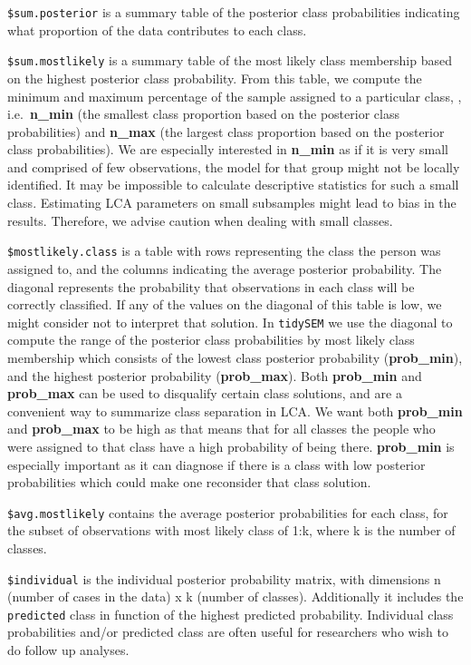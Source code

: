 \documentclass[
  ,man,floatsintext]{apa6}
\begin{document}
\texttt{\$sum.posterior} is a summary table of the posterior class probabilities
indicating what proportion of the data contributes to each class.

\texttt{\$sum.mostlikely} is a summary table of the most likely class membership
based on the highest posterior class probability. From this table, we
compute the minimum and maximum percentage of the sample assigned to a
particular class, , i.e.~\textbf{n\_min} (the smallest class proportion based
on the posterior class probabilities) and \textbf{n\_max} (the largest class
proportion based on the posterior class probabilities). We are
especially interested in \textbf{n\_min} as if it is very small and comprised
of few observations, the model for that group might not be locally
identified. It may be impossible to calculate descriptive statistics for
such a small class. Estimating LCA parameters on small subsamples might
lead to bias in the results. Therefore, we advise caution when dealing
with small classes.

\texttt{\$mostlikely.class} is a table with rows representing the class the
person was assigned to, and the columns indicating the average posterior
probability. The diagonal represents the probability that observations
in each class will be correctly classified. If any of the values on the
diagonal of this table is low, we might consider not to interpret that
solution. In \texttt{tidySEM} we use the diagonal to compute the range of the
posterior class probabilities by most likely class membership which
consists of the lowest class posterior probability (\textbf{prob\_min}), and
the highest posterior probability (\textbf{prob\_max}). Both \textbf{prob\_min} and
\textbf{prob\_max} can be used to disqualify certain class solutions, and are
a convenient way to summarize class separation in LCA. We want both
\textbf{prob\_min} and \textbf{prob\_max} to be high as that means that for all
classes the people who were assigned to that class have a high
probability of being there. \textbf{prob\_min} is especially important as it
can diagnose if there is a class with low posterior probabilities which
could make one reconsider that class solution.

\texttt{\$avg.mostlikely} contains the average posterior probabilities for each
class, for the subset of observations with most likely class of 1:k,
where k is the number of classes.

\texttt{\$individual} is the individual posterior probability matrix, with
dimensions n (number of cases in the data) x k (number of classes). Additionally it includes the \texttt{predicted} class in function of the highest predicted probability.
Individual class probabilities and/or predicted class are often useful for researchers who wish to do follow up analyses.
\end{document}
